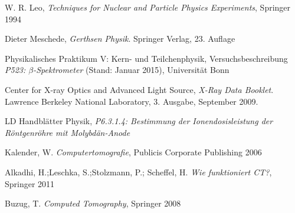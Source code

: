 \documentclass[11pt, a4paper]{article}
\numberwithin{equation}{section}
\begin{document}
\FloatBarrier
\vspace{\fill}
\begin{thebibliography}{19}
	W. R. Leo,
	\emph{Techniques for Nuclear and Particle Physics Experiments},
	Springer 1994
	
	Dieter Meschede,
	\emph{Gerthsen Physik}.
	Springer Verlag,
	23. Auflage

	Physikalisches Praktikum V: Kern- und Teilchenphysik,
	Versuchsbeschreibung \emph{P523: $\beta$-Spektrometer} (Stand: Januar 2015),
	Universität Bonn	

	Center for X-ray Optics and Advanced Light Source,
	\emph{X-Ray Data Booklet}.
	Lawrence Berkeley National Laboratory,
	3. Ausgabe,
	September 2009.

	LD Handblätter Physik,
	\emph{P6.3.1.4: Bestimmung der Ionendosisleistung der Röntgenröhre mit Molybdän-Anode}
	
	Kalender, W.
	\emph{Computertomografie},
	Publicis Corporate Publishing 2006
	
	Alkadhi, H.;Leschka, S.;Stolzmann, P.; Scheffel, H.
	\emph{Wie funktioniert CT?},
	Springer 2011
	
	Buzug, T.
	\emph{Computed Tomography},
	Springer 2008

\end{thebibliography}
\end{document}
